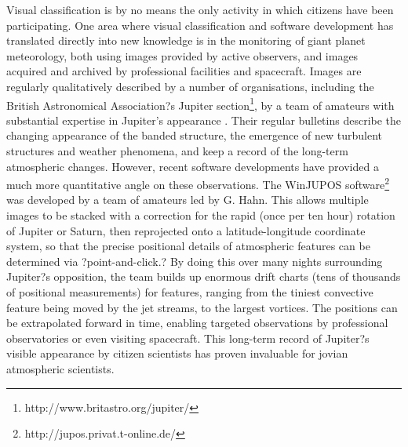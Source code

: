 \documentclass{ar2e}
\begin{document}
Visual classification is by no means the only activity in which citizens have
been participating.  One area where visual classification and software
development has translated directly into new knowledge is in the monitoring of
giant planet meteorology, both using images provided by active observers, and
images acquired and archived by professional facilities and spacecraft. 
Images are regularly qualitatively described by a number of organisations,
including the British Astronomical Association?s Jupiter
section\footnote{http://www.britastro.org/jupiter/}, by a team of amateurs
with substantial expertise in Jupiter's appearance \citep{95rogers}.  Their
regular bulletins describe the changing appearance of the banded structure,
the emergence of new turbulent structures and weather phenomena, and keep a
record of the long-term atmospheric changes.  However, recent software
developments have provided a much more quantitative angle on these
observations.  The WinJUPOS
software\footnote{http://jupos.privat.t-online.de/} was developed by a team of
amateurs led by G. Hahn.  This allows multiple images to be stacked with a
correction for the rapid (once per ten hour) rotation of Jupiter or Saturn,
then reprojected onto a latitude-longitude coordinate system, so that the
precise positional details of atmospheric features can be determined via
?point-and-click.?  By doing this over many nights surrounding Jupiter?s
opposition, the team builds up enormous drift charts (tens of thousands of
positional measurements) for features, ranging from the tiniest convective
feature being moved by the jet streams, to the largest vortices.  The
positions can be extrapolated forward in time, enabling targeted observations
by professional observatories or even visiting spacecraft.  This long-term
record of Jupiter?s visible appearance by citizen scientists has proven
invaluable for jovian atmospheric scientists.
\end{document}
